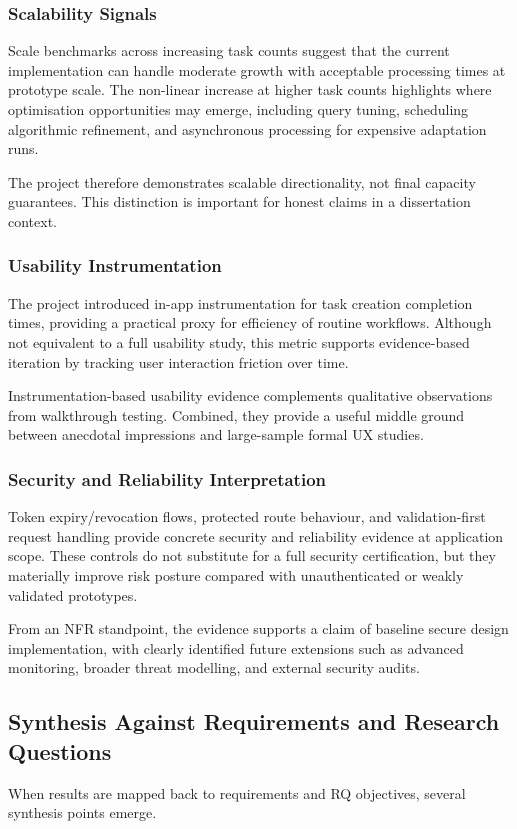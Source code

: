 \documentclass[12pt]{article}
\begin{document}
\subsubsection{Scalability Signals}
Scale benchmarks across increasing task counts suggest that the current implementation can handle moderate growth with acceptable processing times at prototype scale. The non-linear increase at higher task counts highlights where optimisation opportunities may emerge, including query tuning, scheduling algorithmic refinement, and asynchronous processing for expensive adaptation runs.

The project therefore demonstrates scalable directionality, not final capacity guarantees. This distinction is important for honest claims in a dissertation context.

\subsubsection{Usability Instrumentation}
The project introduced in-app instrumentation for task creation completion times, providing a practical proxy for efficiency of routine workflows. Although not equivalent to a full usability study, this metric supports evidence-based iteration by tracking user interaction friction over time.

Instrumentation-based usability evidence complements qualitative observations from walkthrough testing. Combined, they provide a useful middle ground between anecdotal impressions and large-sample formal UX studies.

\subsubsection{Security and Reliability Interpretation}
Token expiry/revocation flows, protected route behaviour, and validation-first request handling provide concrete security and reliability evidence at application scope. These controls do not substitute for a full security certification, but they materially improve risk posture compared with unauthenticated or weakly validated prototypes.

From an NFR standpoint, the evidence supports a claim of baseline secure design implementation, with clearly identified future extensions such as advanced monitoring, broader threat modelling, and external security audits.

\subsection{Synthesis Against Requirements and Research Questions}
When results are mapped back to requirements and RQ objectives, several synthesis points emerge.
\end{document}
